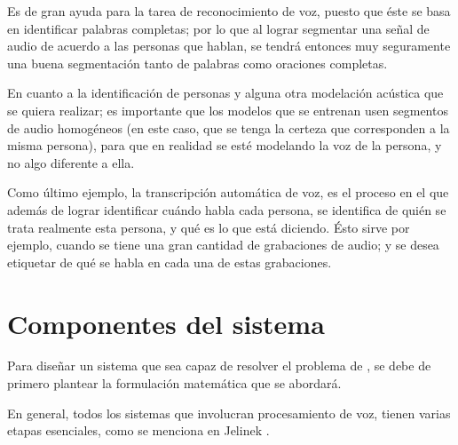 Es de gran ayuda para la tarea de reconocimiento de voz, puesto que éste se basa en identificar palabras completas; por lo que al lograr segmentar una señal de audio de acuerdo a las personas que hablan, se tendrá entonces muy seguramente una buena segmentación tanto de palabras como oraciones completas.

En cuanto a la identificación de personas y alguna otra modelación acústica que se quiera realizar; es importante que los modelos que se entrenan usen segmentos de audio homogéneos (en este caso, que se tenga la certeza que corresponden a la misma persona), para que en realidad se esté modelando la voz de la persona, y no algo diferente a ella.

Como último ejemplo, la transcripción automática de voz, es el proceso en el que además de lograr identificar cuándo habla cada persona, se identifica de quién se trata realmente esta persona, y qué es lo que está diciendo. Ésto sirve por ejemplo, cuando se tiene una gran cantidad de grabaciones de audio; y se desea etiquetar de qué se habla en cada una de estas grabaciones. 

\section{Componentes del sistema}

Para diseñar un sistema que sea capaz de resolver el problema de \sd, se debe de primero plantear la formulación matemática que se abordará. 

En general, todos los sistemas que involucran procesamiento de voz, tienen varias etapas esenciales, como se menciona en Jelinek \cite{Jelinek1998}. 

